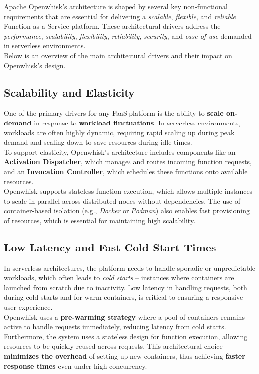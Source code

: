 Apache Openwhisk’s architecture is shaped by several key non-functional requirements that are essential for delivering a \textit{scalable}, \textit{flexible}, and \textit{reliable} Function-as-a-Service platform. These architectural drivers address the \textit{performance}, \textit{scalability}, \textit{flexibility}, \textit{reliability}, \textit{security}, and \textit{ease of use} demanded in serverless environments.\\
Below is an overview of the main architectural drivers and their impact on Openwhisk’s design.
\subsection{Scalability and Elasticity}
One of the primary drivers for any FaaS platform is the ability to \textbf{scale on-demand} in response to \textbf{workload fluctuations}. In serverless environments, workloads are often highly dynamic, requiring rapid scaling up during peak demand and scaling down to save resources during idle times.\vspace{14pt}\\
To support elasticity, Openwhisk’s architecture includes components like an \textbf{Activation Dispatcher}, which manages and routes incoming function requests, and an \textbf{Invocation Controller}, which schedules these functions onto available resources.\\
Openwhisk supports stateless function execution, which allows multiple instances to scale in parallel across distributed nodes without dependencies. The use of container-based isolation (e.g., \textit{Docker} or \textit{Podman}) also enables fast provisioning of resources, which is essential for maintaining high scalability.
\subsection{Low Latency and Fast Cold Start Times}
In serverless architectures, the platform needs to handle sporadic or unpredictable workloads, which often leads to \textit{cold starts} -- instances where containers are launched from scratch due to inactivity. Low latency in handling requests, both during cold starts and for warm containers, is critical to ensuring a responsive user experience.\vspace{14pt}\\
Openwhisk uses a \textbf{pre-warming strategy} where a pool of containers remains active to handle requests immediately, reducing latency from cold starts. Furthermore, the system uses a stateless design for function execution, allowing resources to be quickly reused across requests. This architectural choice \textbf{minimizes the overhead} of setting up new containers, thus achieving \textbf{faster response times} even under high concurrency.
